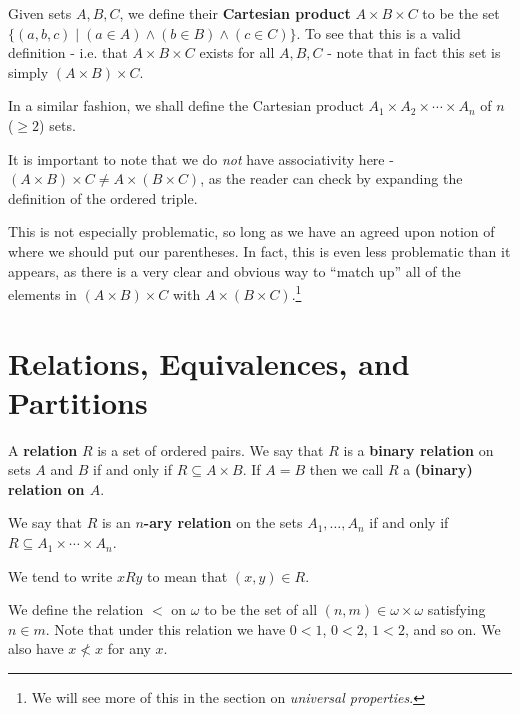 \begin{defn}
\label{Defn:_Product_of_n_sets}
Given sets $A, B, C$, we define their \textbf{Cartesian product} $A\times B\times C$ to be the set $\{(a, b, c)\mid (a\in A) \land (b\in B)\land (c\in C)\}$. To see that this is a valid definition - i.e. that $A\times B\times C$ exists for all $A, B, C$ - note that in fact this set is simply $(A\times B)\times C$. 

In a similar fashion, we shall define the Cartesian product $A_1\times A_2\times \cdots \times A_n$ of $n$ ($\geq 2$) sets.
\end{defn}

It is important to note that we do \emph{not} have associativity here - $(A\times B)\times C\neq A\times (B \times C)$, as the reader can check by expanding the definition of the ordered triple.

This is not especially problematic, so long as we have an agreed upon notion of where we should put our parentheses. In fact, this is even less problematic than it appears, as there is a very clear and obvious way to \enquote{match up} all of the elements in $(A\times B)\times C$ with $A\times (B\times C)$.\footnote{We will see more of this in the section on \emph{universal properties}.} 

\section{Relations, Equivalences, and Partitions}
\label{--Sec:_Relations_Equivalences_and_Partitions}

\begin{defn}
\label{Defn_(n-ary)_Relation}

A \textbf{relation} $R$ is a set of ordered pairs. We say that $R$ is a \textbf{binary relation} on sets $A$ and $B$ if and only if $R\subseteq A\times B$. If $A=B$ then we call $R$ a \textbf{(binary) relation on $A$}.

We say that $R$ is an \textbf{$n$-ary relation} on the sets $A_1,\dots, A_n$ if and only if $R\subseteq A_1\times\cdots\times A_n$.

We tend to write $xRy$ to mean that $(x, y)\in R$.
\end{defn}

\begin{example} 
\label{Example:_Defining_less_than_on_N}
We define the relation $<$ on $\omega$ to be the set of all $(n, m)\in \omega\times \omega$ satisfying $n\in m$. Note that under this relation we have $0<1$, $0<2$, $1<2$, and so on. We also have $x\nless x$ for any $x$.
\end{example}

